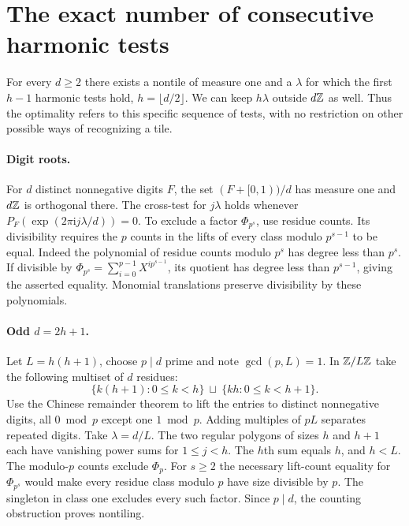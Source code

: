 \documentclass[11pt,a4paper]{article}
\begin{document}
\section*{The exact number of consecutive harmonic tests}
For every $d\ge2$ there exists a nontile of measure one and a $\lambda$ for which the first $h-1$ harmonic tests hold, $h=\lfloor d/2\rfloor$. We can keep $h\lambda$ outside $d\mathbb Z$ as well. Thus the optimality refers to this specific sequence of tests, with no restriction on other possible ways of recognizing a tile.
\paragraph{Digit roots.}
For $d$ distinct nonnegative digits $F$, the set $(F+[0,1))/d$ has measure one and $d\mathbb Z$ is orthogonal there. The cross-test for $j\lambda$ holds whenever $P_F(\exp(2\pi\mathrm i j\lambda/d))=0$. To exclude a factor $\Phi_{p^s}$, use residue counts. Its divisibility requires the $p$ counts in the lifts of every class modulo $p^{s-1}$ to be equal. Indeed the polynomial of residue counts modulo $p^s$ has degree less than $p^s$. If divisible by $\Phi_{p^s}=\sum_{i=0}^{p-1}X^{ip^{s-1}}$, its quotient has degree less than $p^{s-1}$, giving the asserted equality. Monomial translations preserve divisibility by these polynomials.
\paragraph{Odd $d=2h+1$.}
Let $L=h(h+1)$, choose $p\mid d$ prime and note $\gcd(p,L)=1$. In $\mathbb Z/L\mathbb Z$ take the following multiset of $d$ residues:
\[
   \{k(h+1):0\le k<h\}\ \sqcup\ \{kh:0\le k<h+1\}.
\]
Use the Chinese remainder theorem to lift the entries to distinct nonnegative digits, all $0\bmod p$ except one $1\bmod p$. Adding multiples of $pL$ separates repeated digits. Take $\lambda=d/L$. The two regular polygons of sizes $h$ and $h+1$ each have vanishing power sums for $1\le j<h$. The $h$th sum equals $h$, and $h<L$. The modulo-$p$ counts exclude $\Phi_p$. For $s\ge2$ the necessary lift-count equality for $\Phi_{p^s}$ would make every residue class modulo $p$ have size divisible by $p$. The singleton in class one excludes every such factor. Since $p\mid d$, the counting obstruction proves nontiling.
\end{document}
